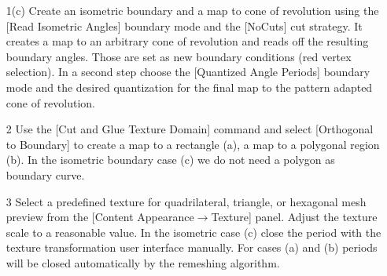 \documentclass[Thesis.tex]{subfiles}
\begin{document}
\begin{itemize}
\item[1(c)] Create an isometric boundary and a map to cone of revolution using the [Read Isometric Angles] boundary mode and the [NoCuts] cut strategy. It creates a map to an arbitrary cone of revolution and reads off the resulting boundary angles. Those are set as new boundary conditions (red vertex selection). In a second step choose the [Quantized Angle Periods] boundary mode and the desired quantization for the final map to the pattern adapted cone of revolution.

\begin{center}
\begin{minipage}{0.9\linewidth}
            \centering
\end{minipage}
\end{center}    

\item[2] Use the [Cut and Glue Texture Domain] command and select [Orthogonal to Boundary] to create a map to a rectangle (a), a map to a polygonal region (b). In the isometric boundary case (c) we do not need a polygon as boundary curve.
\item[3] Select a predefined texture for quadrilateral, triangle, or hexagonal mesh preview from the [Content Appearance$\to$Texture] panel. Adjust the texture scale to a reasonable value. In the isometric case (c) close the period with the texture transformation user interface manually. For cases (a) and (b) periods will be closed automatically by the remeshing algorithm.

\begin{center}
\begin{minipage}{0.9\linewidth}
            \centering
\end{minipage}
\end{center}    


\end{itemize}
\end{document}
